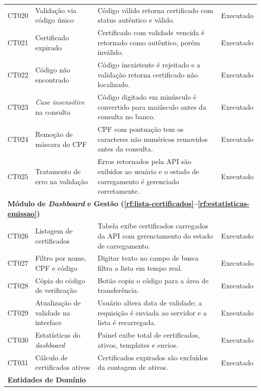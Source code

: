 \begin{longtable}{p{1.2cm} p{4.2cm} p{7.5cm} p{2.6cm}}
CT020 & Validação via código único & Código válido retorna certificado com status autêntico e válido. & Executado \\
CT021 & Certificado expirado & Certificado com validade vencida é retornado como autêntico, porém inválido. & Executado \\
CT022 & Código não encontrado & Código inexistente é rejeitado e a validação retorna certificado não localizado. & Executado \\
CT023 & \textit{Case insensitive} na consulta & Código digitado em minúsculo é convertido para maiúsculo antes da consulta no banco. & Executado \\
CT024 & Remoção de máscara do CPF & CPF com pontuação tem os caracteres não numéricos removidos antes da consulta. & Executado \\
CT025 & Tratamento de erro na validação & Erros retornados pela API são exibidos ao usuário e o estado de carregamento é gerenciado corretamente. & Executado \\

\midrule
\multicolumn{4}{l}{\textbf{Módulo de \textit{Dashboard} e Gestão (\ref{rf:lista-certificados}--\ref{rf:estatisticas-emissao})}} \\
\midrule

CT026 & Listagem de certificados & Tabela exibe certificados carregados da API com gerenciamento do estado de carregamento. & Executado \\
CT027 & Filtro por nome, CPF e código & Digitar texto no campo de busca filtra a lista em tempo real. & Executado \\
CT028 & Cópia do código de verificação & Botão copia o código para a área de transferência. & Executado \\
CT029 & Atualização de validade na interface & Usuário altera data de validade; a requisição é enviada ao servidor e a lista é recarregada. & Executado \\
CT030 & Estatísticas do \textit{dashboard} & Painel exibe total de certificados, ativos, templates e envios. & Executado \\
CT031 & Cálculo de certificados ativos & Certificados expirados são excluídos da contagem de ativos. & Executado \\

\midrule
\multicolumn{3}{l}{\textbf{Entidades de Domínio}} \\
\midrule


\end{longtable}
